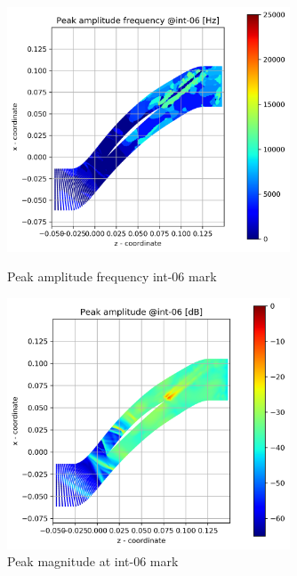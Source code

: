 \begin{figure}[ht]
  \centering
  \includegraphics[width=0.75\textwidth]{Figures/int-06-peak-freq.png}
  \caption{Peak amplitude frequency int-06 mark} \label{int-06-peak-freq}
  
  \vspace*{\floatsep}%

  \includegraphics[width=0.75\textwidth]{Figures/int-06-peak-mag.png}
  \caption{Peak magnitude at int-06 mark} \label{int-06-peak-mag}
\end{figure}

